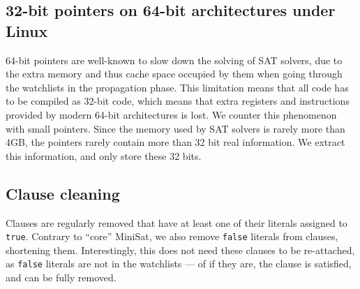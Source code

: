 \documentclass[final]{ieee}
\begin{document}
\subsection{32-bit pointers on 64-bit architectures under Linux}
64-bit pointers are well-known to slow down the solving of SAT solvers, due to the extra memory and thus cache space occupied by them when going through the watchlists in the propagation phase. This limitation means that all code has to be compiled as 32-bit code, which means that extra registers and instructions provided by modern 64-bit architectures is lost. We counter this phenomenon with small pointers. Since the memory used by SAT solvers is rarely more than 4GB, the pointers rarely contain more than 32 bit real information. We extract this information, and only store these 32 bits. %


\subsection{Clause cleaning}
Clauses are regularly removed that have at least one of their literals assigned to \texttt{true}. Contrary to ``core'' MiniSat, we also remove \texttt{false} literals from clauses, shortening them. Interestingly, this does not need these clauses to be re-attached, as \texttt{false} literals are not in the watchlists --- of if they are, the clause is satisfied, and can be fully removed.

\end{document}
